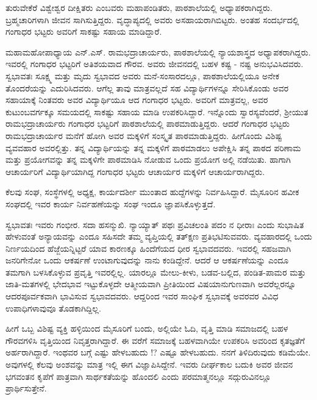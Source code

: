 ತುರುವೇಕೆರೆ ವಿಶ್ವೇಶ್ವರ ದೀಕ್ಷಿತರು ಎಂಬವರು ಮಹಾಪಂಡಿತರು, ಪಾಠಶಾಲೆಯಲ್ಲಿ ಅಧ್ಯಾಪಕರಾಗಿದ್ದರು. ಬ್ರಹ್ಮಚಾರಿಗಳಾಗಿ ಜೀವನ ಸಾಗಿಸುತ್ತಿದ್ದರು. ವೃದ್ಧಾಪ್ಯದಲ್ಲಿ ಅವರು ಅಸಹಾಯರಾಗಿಬಿಟ್ಟರು. ಅಂತಹ ಸಂದರ್ಭದಲ್ಲಿ ಗಂಗಾಧರ ಭಟ್ಟರು ಅವರಿಗೆ ಸಾಕಷ್ಟು ಸಹಾಯ ಮಾಡಿದ್ದಾರೆ. 

ಮಹಾಮಹೋಪಾಧ್ಯಾಯ ಎನ್.ಎಸ್. ರಾಮಭದ್ರಾಚಾರ್ಯರು, ಪಾಠಶಾಲೆಯಲ್ಲಿ ನ್ಯಾಯಶಾಸ್ತ್ರದ ಅಧ್ಯಾಪಕರಾಗಿದ್ದರು. ಇವರಲ್ಲಿ ಗಂಗಾಧರ ಭಟ್ಟರಿಗೆ ಅತಿಶಯವಾದ ಗೌರವ. ಅವರು ಜೀವನದಲ್ಲಿ ಬಹಳ ಕಷ್ಟ - ನಷ್ಟ ಅನುಭವಿಸಿದವರು. ಸ್ವಭಾವತಃ ಸೂಕ್ಷ್ಮ ಮತ್ತು ಮೃದು ಸ್ವಭಾವದ ಅವರು ಮನೆ-ಸಂಸಾರದಲ್ಲೂ, ಪಾಠಶಾಲೆಯಲ್ಲಿಯೂ ಅನೇಕ ತೊಂದರೆಯನ್ನು ಎದುರಿಸಿದವರು. ಆಗೆಲ್ಲ ತಾವು ಮಾತ್ರವಲ್ಲದೆ ಸಹ ವಿದ್ಯಾರ್ಥಿಗಳನ್ನೂ ಸೇರಿಸಿಕೊಂಡು ಅವರ ಸಹಾಯಾಕ್ಕೆ ನಿಂತವರು ಅವರ ವಿದ್ಯಾರ್ಥಿಯೂ ಆದ ಗಂಗಾಧರ ಭಟ್ಟರು. ಅವರಿಗೆ ಮಾತ್ರವಲ್ಲ, ಅವರ  ಕುಟುಂಬವರ್ಗಕ್ಕೂ ಸಮಯದಲ್ಲಿ ಸಾಕಷ್ಟು ಸಹಾಯ ಮಾಡಿ ಉಪಕರಿಸಿದ್ದಾರೆ. ಇನ್ನೊಂದು ಸ್ವಾರಸ್ಯವೆಂದರೆ, ಶ್ರೀಯುತ ರಾಮಭದ್ರಾಚಾರ್ಯರು ಗಂಗಾಧರ ಭಟ್ಟರಿಗೆ ಪಾಠಶಾಲೆಯಲ್ಲಿ ಪಾಠಮಾಡುತ್ತಿದ್ದರು. ಆದರೆ ಗಂಗಾಧರ ಭಟ್ಟರು ರಾಮಭದ್ರಾಚಾರ್ಯರ  ಮನೆಗೆ ಹೋಗಿ ಅವರ ಮಕ್ಕಳಿಗೆ ಸಂಸ್ಕೃತ ಪಾಠಮಾಡುತ್ತಿದ್ದರು. ಹೀಗೊಂದು ವಿಶಿಷ್ಟ ವ್ಯವವಹಾರ ಅವರಲ್ಲಿತ್ತು. ತನ್ನ ವಿದ್ಯಾರ್ಥಿಯನ್ನು ತನ್ನ ಮಕ್ಕಳಿಗೆ ಪಾಠಮಾಡಲು ಅಪೇಕ್ಷಿಸಿ ತನ್ನ ಪಾಠದ ಪರಿಣಾಮ ಮತ್ತು ಪ್ರಯೋಗವನ್ನು ತನ್ನ ಮಕ್ಕಳಿಗೇ ಪಾಠಮಾಡಿಸಿ ನೋಡುವ ಒಂದು ಪ್ರಯೋಗ ಅಲ್ಲಿ ನಡೆಯಿತು.  ಹಾಗಾಗಿ ಆಚಾರ್ಯರಿಗೆ ವಿದ್ಯಾರ್ಥಿಯಾಗಿದ್ದ ಗಂಗಾಧರ ಭಟ್ಟರು  ಆಚಾರ್ಯರ ಮಕ್ಕಳಿಗೆ ಆಚಾರ್ಯರಾಗಿದ್ದರು.

ಕೆಲವು ಸಂಘ, ಸಂಸ್ಥೆಗಳಲ್ಲಿ ಅಧ್ಯಕ್ಷ, ಕಾರ್ಯದರ್ಶೀ ಮುಂತಾದ ಹುದ್ದೆಗಳನ್ನು ನಿರ್ವಹಿಸಿದ್ದಾರೆ. ಮೈಸೂರಿನ ಹವೀಕ ಸಂಘದಲ್ಲಿ ಇವರ ಕಾರ್ಯ ನಿರ್ವಹಣೆಯನ್ನು ಸಂಘ ಇಂದೂ ಜ್ಞಾಪಸಿಕೊಳ್ಳುತ್ತದೆ. 

ಸ್ವಭಾವತಃ ಇವರು ಗಂಭೀರ. ಸದಾ ಹಸನ್ಮುಖಿ. ನ್ಯಾಯ್ಯಾತ್ ಪಥಃ ಪ್ರವಿಚಲಂತಿ ಪದಂ ನ ಧೀರಾಃ ಎಂದು ಸುಭಾಷಿತ ಹೇಳುವಂತೆ ಅನ್ಯಾಯವನ್ನು ಎಂದೂ ಸಹಿಸದೇ ತಮ್ಮ ವ್ಯಪ್ತಿಯಲ್ಲಿ ತತ್ಕ್ಷಣ ಪ್ರತಿಭಟಿಸುವವರು. ವ್ಯವಹಾರದಲ್ಲಿ ಒಂದು  ನಿರ್ಣಯದಿಂದ ಹೆಜ್ಜೆಯನ್ನಿಟ್ಟರೆ ಯಾವ ಕಾರಣಕ್ಕೂ ಹಿಂದೆಗೆಯದ ಧೀರ ಸ್ವಭಾವದವರು. ಇವರಲ್ಲಿ ಸಹಜವಾಗಿ ಜನರಿಗೇನೋ ಒಂದು ಆಕರ್ಷಣೆ ಉಂಟಾಗುವುದನ್ನು ನಾನು ಕಂಡಿದ್ದೇನೆ. ಆದರೆ ಆ ಆಕರ್ಷಣೆಯನ್ನು ಎಂದೂ ತಮಗಾಗಿ ಬಳಸಿಕೊಳ್ಳುವ ಪ್ರವೃತ್ತಿ ಇವರಲ್ಲಿಲ್ಲ.  ಯಾರಲ್ಲೂ ಮೇಲು-ಕೀಳು, ಬಡವ-ಬಲ್ಲಿದ, ಪಂಡಿತ-ಪಾಮರ ಮತ್ತು ಜಾತಿ-ಮತಗಳಲ್ಲಿ ಭೇದಭಾವ ಇಟ್ಟುಕೊಳ್ಳದೇ ಆತ್ಮೀಯವಾಗಿ ಪ್ರೀತಿಯಿಂದ ವಿಷಯಾನುಗುಣವಾಗಿ ಅವರೆಲ್ಲರನ್ನೂ ಆದರಪೂರ್ವಕವಾಗಿ ಭಾವಿಸುವ ಸ್ವಭಾವದವರು. ಆದ್ದರಿಂದ ಇವರ ಸಾಂಘಿಕ ಸ್ವಭಾವಕ್ಕೆ ಅವರವರ ವಿವಿಧ ಉಪಾಧಿಗಳಾವುವೂ  ತೊಡಕಾಗಿದ್ದಿಲ್ಲ.

ಹೀಗೆ ಒಬ್ಬ ವಿಶಿಷ್ಟ ವ್ಯಕ್ತಿ ಹಳ್ಳಿಯಿಂದ ಮೈಸೂರಿಗೆ ಬಂದು, ಅಲ್ಲಿಯೇ ಓದಿ, ವೃತ್ತಿ ಮಾಡಿ ಸಮಾಜದಲ್ಲಿ ಬಹಳ ಗೌರವಗಳಿಸಿ ವೃತ್ತಿಯಿಂದ ನಿವೃತ್ತರಾಗಿದ್ದಾರೆ. ಈ ವರೆಗೆ ಸಮಾಜಕ್ಕೆ ಬಹಳವಾಗಿಯೇ ಉಪಕರಿಸಿ ಅವರಿಂದ ಕೃತಜ್ಞತೆಗೆ ಅರ್ಹರಾಗಿದ್ದಾರೆ. ಇಂಥವರ ಬಗ್ಗೆ ಎಷ್ಟು ಹೇಳಬಹುದು !? ಎಷ್ಟೂ ಹೇಳಬಹುದು. ನನಗೆ ತಿಳಿದಿರುವುದು ಕಡಿಮೆಯೇ. ಅವುಗಳಲ್ಲಿ ಕೆಲವು ಅಂಶವನ್ನು ಮಾತ್ರ ಇಲ್ಲಿ ಈಗ ವಿಜ್ಞಾಪಿಸಿದ್ದೇನೆ. ಇವರು ದೀರ್ಘಕಾಲ ಬದುಕಿ ಅವರ ಜೀವನ ಭಗವಂತನ ಕೃಪೆಗೆ ಪಾತ್ರವಾಗಿ ಸಾರ್ಥಕತೆಯನ್ನು ಹೊಂದಲಿ ಎಂದು ಪರಮಾತ್ಮನಲ್ಲೂ ಸದ್ಗುರುವಿನಲ್ಲೂ ಪ್ರಾರ್ಥಿಸುತ್ತೇನೆ.

